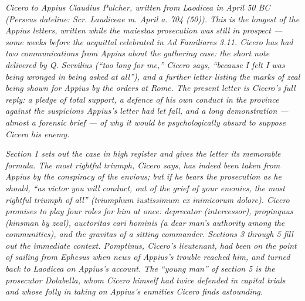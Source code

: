 
\textit{Cicero to Appius Claudius Pulcher, written from
Laodicea in April 50 BC (Perseus dateline:
\textit{Scr. Laudiceae m. April a. 704 (50)}). This is
the longest of the Appius letters, written while the
\textit{maiestas} prosecution was still in prospect ---
some weeks before the acquittal celebrated in
\textit{Ad Familiares} 3.11. Cicero has had two
communications from Appius about the gathering case:
the short note delivered by Q. Servilius (``too long
for me,'' Cicero says, ``because I felt I was being
wronged in being asked at all''), and a further
letter listing the marks of zeal being shown for
Appius by the orders at Rome. The present letter is
Cicero's full reply: a pledge of total support, a
defence of his own conduct in the province against
the suspicions Appius's letter had let fall, and a
long demonstration --- almost a forensic brief --- of
why it would be psychologically absurd to suppose
Cicero his enemy.}

\textit{Section 1 sets out the case in high register
and gives the letter its memorable formula. The most
rightful triumph, Cicero says, has indeed been taken
from Appius by the conspiracy of the envious; but if
he bears the prosecution as he should, ``as victor
you will conduct, out of the grief of your enemies,
the most rightful triumph of all'' (\textit{triumphum
iustissimum ex inimicorum dolore}). Cicero promises to
play four roles for him at once: \textit{deprecator}
(intercessor), \textit{propinquus} (kinsman by zeal),
\textit{auctoritas cari hominis} (a dear man's
authority among the communities), and the
\textit{gravitas} of a sitting commander. Sections 3
through 5 fill out the immediate context. Pomptinus,
Cicero's lieutenant, had been on the point of sailing
from Ephesus when news of Appius's trouble reached
him, and turned back to Laodicea on Appius's account.
The ``young man'' of section 5 is the prosecutor
Dolabella, whom Cicero himself had twice defended in
capital trials and whose folly in taking on Appius's
enmities Cicero finds astounding.}

